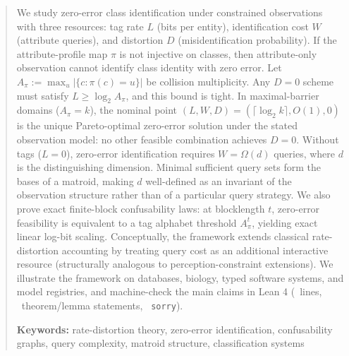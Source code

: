\begin{abstract}
We study zero-error class identification under constrained observations with three resources: tag rate $L$ (bits per entity), identification cost $W$ (attribute queries), and distortion $D$ (misidentification probability). If the attribute-profile map $\pi$ is not injective on classes, then attribute-only observation cannot identify class identity with zero error. Let $A_\pi := \max_u |\{c : \pi(c)=u\}|$ be collision multiplicity. Any $D=0$ scheme must satisfy $L \ge \log_2 A_\pi$, and this bound is tight. In maximal-barrier domains ($A_\pi=k$), the nominal point $(L,W,D)=(\lceil\log_2 k\rceil,O(1),0)$ is the unique Pareto-optimal zero-error solution under the stated observation model: no other feasible combination achieves $D=0$. Without tags ($L=0$), zero-error identification requires $W=\Omega(d)$ queries, where $d$ is the distinguishing dimension. Minimal sufficient query sets form the bases of a matroid, making $d$ well-defined as an invariant of the observation structure rather than of a particular query strategy. We also prove exact finite-block confusability laws: at blocklength $t$, zero-error feasibility is equivalent to a tag alphabet threshold $A_\pi^t$, yielding exact linear log-bit scaling. Conceptually, the framework extends classical rate-distortion accounting by treating query cost as an additional interactive resource (structurally analogous to perception-constraint extensions). We illustrate the framework on databases, biology, typed software systems, and model registries, and machine-check the main claims in Lean 4 (\LeanTotalLines\ lines, \LeanTotalTheorems\ theorem/lemma statements, \LeanTotalSorry\ \texttt{sorry}).

\textbf{Keywords:} rate-distortion theory, zero-error identification, confusability graphs, query complexity, matroid structure, classification systems
\end{abstract}
